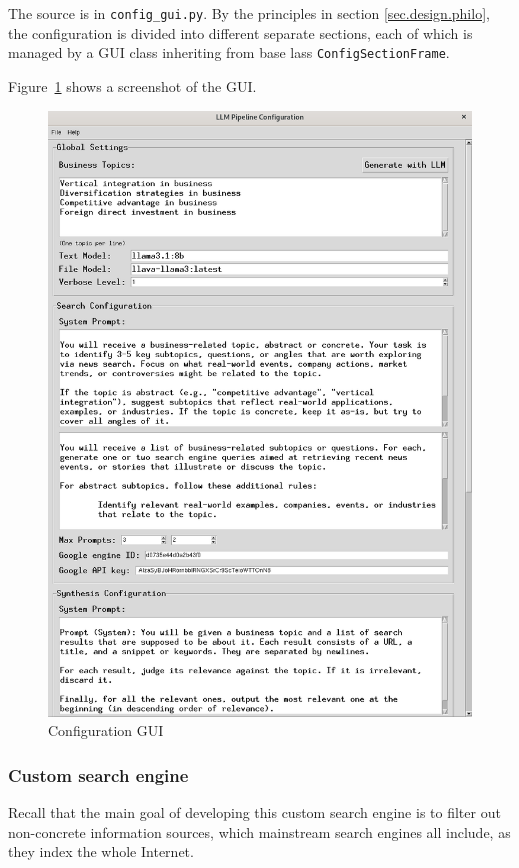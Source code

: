 \documentclass[final-report]{report-template}
\newcommand\ttb{\discretionary{}{}{}}
\begin{document}
The source is in \verb!config_gui.py!. By the principles in section
\ref{sec.design.philo}, the configuration is divided into different separate
sections, each of which is managed by a GUI class inheriting from base lass
\texttt{Config\ttb Section\ttb Frame}.

Figure~\ref{fig.config.gui} shows a screenshot of the GUI.
\begin{figure}[hbtp!]
	\centering
	\includegraphics[height=.25\textheight]{res/gui.png}
	\caption{Configuration GUI}
	\label{fig.config.gui}
\end{figure}

\subsubsection{Custom search engine}
Recall that the main goal of developing this custom search engine is to 
filter out non-concrete information sources, which mainstream search engines
all include, as they index the whole Internet.
\end{document}
